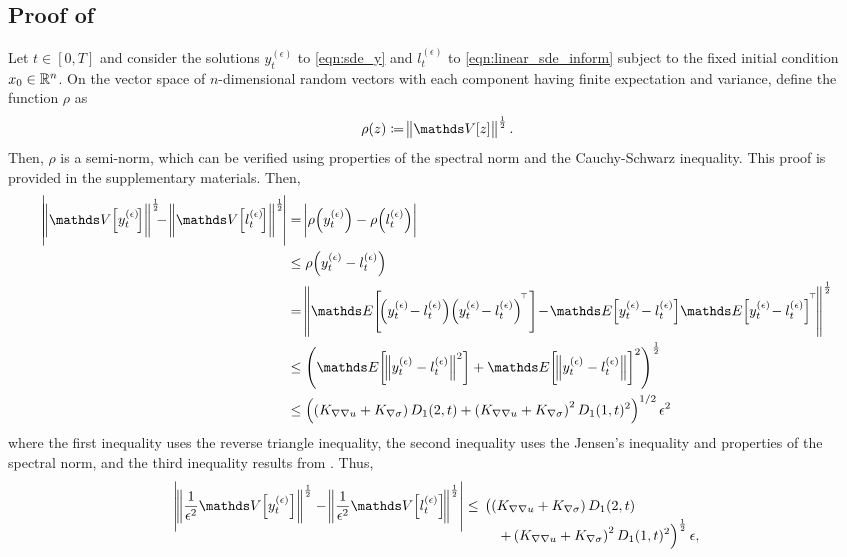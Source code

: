 \subsection{Proof of }\label{app:s2_calculation_proof}
Let \(t \in [0,T]\) and consider the solutions \(y_t^{(\epsilon)}\) to \cref{eqn:sde_y} and \(l_t^{(\epsilon)}\) to \cref{eqn:linear_sde_inform} subject to the fixed initial condition \(x_0 \in \mathbb{R}^n\).
On the vector space of \(n\)-dimensional random vectors with each component having finite expectation and variance, define the function \(\rho\) as
\[
	\rho\!\left(z\right) \coloneqq \norm{\var{z}}^{\frac12}.
\]
Then, \(\rho\) is a semi-norm, which can be verified using properties of the spectral norm and the Cauchy-Schwarz inequality.
This proof is provided in the supplementary materials.
Then,
\begin{align*}
	\abs{\!\norm{\var{y_t^{(\epsilon)}\!}}^{\frac12}\!\!\! - \norm{\var{l_t^{(\epsilon)}\!}}^{\frac12}\!}
	 & = \abs{\rho\!\left(y_t^{(\epsilon)}\right) - \rho\!\left(l_t^{(\epsilon)}\right) }                                                                                                                                                       \\
	 & \leq \rho\!\left(y_t^{(\epsilon)} - l_t^{(\epsilon)}\right)                                                                                                                                                                              \\
	 & = \norm{\avg{\!\left(y_t^{(\epsilon)}\!- l_t^{(\epsilon)}\right)\!\left(y_t^{(\epsilon)}\!- l_t^{(\epsilon)}\right)^{\T}}\! - \!\avg{y_t^{(\epsilon)}\!- l_t^{(\epsilon)}}\!\avg{y_t^{(\epsilon)}\!- l_t^{(\epsilon)}}^{\T}\!}^{\frac12} \\
	 & \leq \left(\avg{\norm{y_t^{(\epsilon)} - l_t^{(\epsilon)}}^{2}} + \avg{\norm{y_t^{(\epsilon)} - l_t^{(\epsilon)}}}^2\right)^{\frac12}                                                                                                    \\
	 & \leq \left(\left(K_{\nabla\nabla u} + K_{\nabla\sigma}\right)D_1(2,t)+ \left(K_{\nabla\nabla u} + K_{\nabla\sigma}\right)^2 D_1(1,t)^2\right)^{1/2}\epsilon^2
\end{align*}
where the first inequality uses the reverse triangle inequality, the second inequality uses the Jensen's inequality and properties of the spectral norm, and the third inequality results from .
Thus,
\[
	\abs{\norm{\frac{1}{\epsilon^2}\var{y_t^{(\epsilon)}}}^{\frac12} - \norm{\frac{1}{\epsilon^2}\var{l_t^{(\epsilon)}}\!}^{\frac{1}{2}}} \leq \begin{multlined}[t]
		\left(\left(K_{\nabla\nabla u} + K_{\nabla\sigma}\right)D_1(2,t) \right. \\
		\left. + \left(K_{\nabla\nabla u} + K_{\nabla\sigma}\right)^2 D_1(1,t)^2\right)^{\frac{1}{2}}\epsilon,
	\end{multlined}
\]
